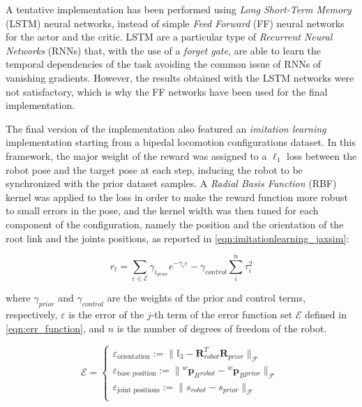 A tentative implementation has been performed using \textit{Long Short-Term Memory} (LSTM) neural networks, instead of simple \textit{Feed Forward} (FF) neural networks for the actor and the critic. \ac{LSTM} are a particular type of \textit{Recurrent Neural Networks} (RNNs) that, with the use of a \textit{forget gate}, are able to learn the temporal dependencies of the task avoiding the common issue of \ac{RNN}s of vanishing gradients. However, the results obtained with the \ac{LSTM} networks were not satisfactory, which is why the \ac{FF} networks have been used for the final implementation.

The final version of the implementation also featured an \textit{imitation learning} implementation starting from a bipedal locomotion configurations dataset. In this framework, the major weight of the reward was assigned to a $\ell_1$ loss between the robot pose and the target pose at each step, inducing the robot to be synchronized with the prior dataset samples. A \textit{Radial Basis Function} (\ac{RBF}) kernel was applied to the loss in order to make the reward function more robust to small errors in the pose, and the kernel width was then tuned for each component of the configuration, namely the position and the orientation of the root link and the joints positions, as reported in \cref{eqn:imitationlearning_jaxsim}:

\begin{equation}
    \label{eqn:imitationlearning_jaxsim}
    r _t = \sum _{\varepsilon \in \mathcal{E}} \gamma _{i _{prior}} e ^{-\gamma _{\epsilon} \varepsilon} - \gamma _{control} \sum _i ^{n} \tau _i ^2
\end{equation}

where $\gamma _{prior}$ and $\gamma _{control}$ are the weights of the prior and control terms, respectively, $\varepsilon$ is the error of the $j$-th term of the error function set $\mathcal{E}$ defined in \cref{eqn:err_function}, and $n$ is the number of degrees of freedom of the robot.

\begin{equation}[right=\empheqrbrace{}]
    \label{eqn:err_function}
    \mathcal{E} =
    \begin{cases}
        \varepsilon _{\text{orientation}}    := \lVert \mathbb{I}_3 - \mathbf{R}_{robot}^T \mathbf{R}_{prior}  \rVert _{\mathcal{F}}        \\
        \varepsilon _{\text{base position}}  := \lVert {}^w \mathbf{p}_B {} _{robot} - {}^w  \mathbf{p}_B {}_{prior}  \rVert _{\mathcal{F}} \\
        \varepsilon _{\text{joint positions}}:= \lVert s _{robot} - s _{prior}  \rVert _{\mathcal{F}}                                       \\
    \end{cases}
\end{equation}

